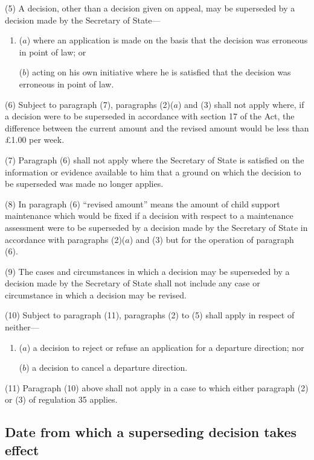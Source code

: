 \documentclass[12pt,a4paper]{article}
\begin{document}
(5) A decision, other than a decision given on appeal, may be superseded by a decision made by the Secretary of State---
\begin{enumerate}\item[]
($a$) where an application is made on the basis that the decision was erroneous in point of law; or

($b$) acting on his own initiative where he is satisfied that the decision was erroneous in point of law.
\end{enumerate}

(6) Subject to paragraph (7), paragraphs (2)($a$) and (3) shall not apply where, if a decision were to be superseded in accordance with section 17 of the Act, the difference between the current amount and the revised amount would be less than £1.00 per week.

(7) Paragraph (6) shall not apply where the Secretary of State is satisfied on the information or evidence available to him that a ground on which the decision to be superseded was made no longer applies.

(8) In paragraph (6) “revised amount” means the amount of child support maintenance which would be fixed if a decision with respect to a maintenance assessment were to be superseded by a decision made by the Secretary of State in accordance with paragraphs (2)($a$) and (3) but for the operation of paragraph (6).

(9) The cases and circumstances in which a decision may be superseded by a decision made by the Secretary of State shall not include any case or circumstance in which a decision may be revised.

(10) Subject to paragraph (11), paragraphs (2) to (5) shall apply in respect of neither---
\begin{enumerate}\item[]
($a$) a decision to reject or refuse an application for a departure direction; nor

($b$) a decision to cancel a departure direction.
\end{enumerate}

(11) Paragraph (10) above shall not apply in a case to which either paragraph (2) or (3) of regulation 35 applies.


\subsection[32E. Date from which a superseding decision takes effect]{Date from which a superseding decision takes effect}
\end{document}
